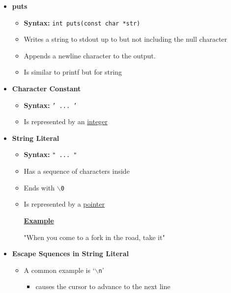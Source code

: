 \documentclass[12pt]{article}
\begin{document}
\begin{enumerate}[1.]
\begin{itemize}
        \item \textbf{puts}

        \begin{itemize}
            \item \textbf{Syntax:} \texttt{int puts(const char *str)}
            \item Writes a string to stdout up to but not including the null character
            \item Appends a newline character to the output.
            \item Is similar to printf but for string
        \end{itemize}

        \item \textbf{Character Constant}

        \begin{itemize}
            \item \textbf{Syntax:} \texttt{' ... '}
            \item Is represented by an \underline{integer}
        \end{itemize}

        \item \textbf{String Literal}
        \begin{itemize}
            \item \textbf{Syntax:} \texttt{" ... "}
            \item Has a sequence of characters inside
            \item Ends with \texttt{$\backslash$0}
            \item Is represented by a \underline{pointer}

            \bigskip

            \underline{\textbf{Example}}

            \bigskip

            "When you come to a fork in the road, take it"
        \end{itemize}

        \item \textbf{Escape Squences in String Literal}

        \begin{itemize}
            \item A common example is `\texttt{$\backslash$n}'

            \begin{itemize}
                \item causes the cursor to advance to the next line
            \end{itemize}
        \end{itemize}
    \end{itemize}


\end{enumerate}
\end{document}
